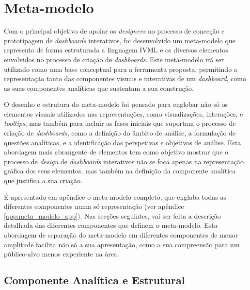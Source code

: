 \section{Meta-modelo} %
\label{sec:meta_modelo}

Com o principal objetivo de apoiar os \textit{designers} no processo de conceção e prototipagem de \textit{dashboards} interativos, foi desenvolvido um meta-modelo que representa de forma estruturada a linguagem IVML e os diversos elementos envolvidos no processo de criação de \textit{dashboards}. Este meta-modelo irá ser utilizado como uma base conceptual para a ferramenta proposta, permitindo a representação tanto das componentes visuais e interativas de um \textit{dashboard}, como as suas componentes analíticas que sustentam a sua construção.

O desenho e estrutura do meta-modelo foi pensado para englobar não só os elementos visuais utilizados nas representações, como visualizações, interações, e \textit{tooltips}, mas também para incluir as fases iniciais que suportam o processo de criação de \textit{dashboards}, como a definição do âmbito de análise, a formulação de questões analíticas, e a identificação das perspetivas e objetivos de análise. Esta abordagem mais abrangente de elementos tem como objetivo mostrar que o processo de \textit{design} de \textit{dashboards} interativos não se foca apenas na representação gráfica dos seus elementos, mas também na definição da componente analítica que justifica a sua criação.

É apresentado em apêndice o meta-modelo completo, que englaba todas as diferentes componentes numa só representação (ver apêndice \ref{app:meta_modelo_app}). Nas secções seguintes, vai ser feita a descrição detalhada das diferentes componentes que definem o meta-modelo. Esta abordagem de separação do meta-modelo em diferentes componentes de menor amplitude facilita não só a sua apresentação, como a sua compreensão para um público-alvo menos experiente na área.

\subsection{Componente Analítica e Estrutural} %
\label{sub:anal_struct_comp}

